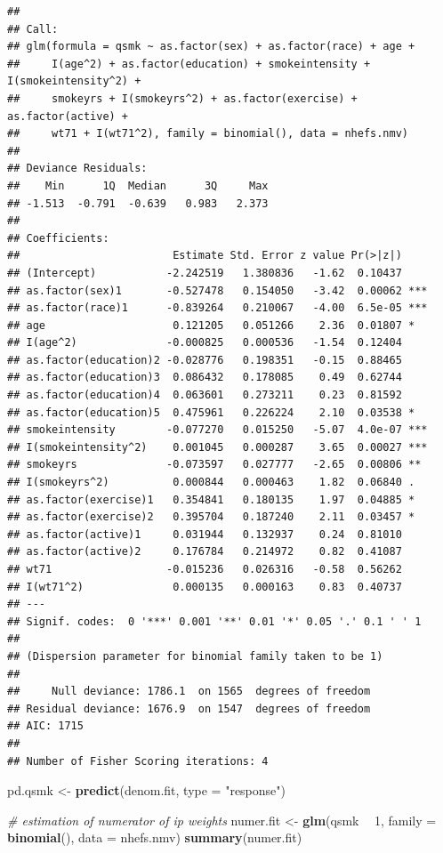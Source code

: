 \documentclass[
  10pt,
]{book}
\newenvironment{Shaded}{\begin{snugshade}}{\end{snugshade}}
\newcommand{\CommentTok}[1]{\textcolor[rgb]{0.56,0.35,0.01}{\textit{#1}}}
\newcommand{\DataTypeTok}[1]{\textcolor[rgb]{0.13,0.29,0.53}{#1}}
\newcommand{\DecValTok}[1]{\textcolor[rgb]{0.00,0.00,0.81}{#1}}
\newcommand{\KeywordTok}[1]{\textcolor[rgb]{0.13,0.29,0.53}{\textbf{#1}}}
\newcommand{\NormalTok}[1]{#1}
\newcommand{\OperatorTok}[1]{\textcolor[rgb]{0.81,0.36,0.00}{\textbf{#1}}}
\newcommand{\StringTok}[1]{\textcolor[rgb]{0.31,0.60,0.02}{#1}}
\begin{document}
\begin{verbatim}
## 
## Call:
## glm(formula = qsmk ~ as.factor(sex) + as.factor(race) + age + 
##     I(age^2) + as.factor(education) + smokeintensity + I(smokeintensity^2) + 
##     smokeyrs + I(smokeyrs^2) + as.factor(exercise) + as.factor(active) + 
##     wt71 + I(wt71^2), family = binomial(), data = nhefs.nmv)
## 
## Deviance Residuals: 
##    Min      1Q  Median      3Q     Max  
## -1.513  -0.791  -0.639   0.983   2.373  
## 
## Coefficients:
##                        Estimate Std. Error z value Pr(>|z|)    
## (Intercept)           -2.242519   1.380836   -1.62  0.10437    
## as.factor(sex)1       -0.527478   0.154050   -3.42  0.00062 ***
## as.factor(race)1      -0.839264   0.210067   -4.00  6.5e-05 ***
## age                    0.121205   0.051266    2.36  0.01807 *  
## I(age^2)              -0.000825   0.000536   -1.54  0.12404    
## as.factor(education)2 -0.028776   0.198351   -0.15  0.88465    
## as.factor(education)3  0.086432   0.178085    0.49  0.62744    
## as.factor(education)4  0.063601   0.273211    0.23  0.81592    
## as.factor(education)5  0.475961   0.226224    2.10  0.03538 *  
## smokeintensity        -0.077270   0.015250   -5.07  4.0e-07 ***
## I(smokeintensity^2)    0.001045   0.000287    3.65  0.00027 ***
## smokeyrs              -0.073597   0.027777   -2.65  0.00806 ** 
## I(smokeyrs^2)          0.000844   0.000463    1.82  0.06840 .  
## as.factor(exercise)1   0.354841   0.180135    1.97  0.04885 *  
## as.factor(exercise)2   0.395704   0.187240    2.11  0.03457 *  
## as.factor(active)1     0.031944   0.132937    0.24  0.81010    
## as.factor(active)2     0.176784   0.214972    0.82  0.41087    
## wt71                  -0.015236   0.026316   -0.58  0.56262    
## I(wt71^2)              0.000135   0.000163    0.83  0.40737    
## ---
## Signif. codes:  0 '***' 0.001 '**' 0.01 '*' 0.05 '.' 0.1 ' ' 1
## 
## (Dispersion parameter for binomial family taken to be 1)
## 
##     Null deviance: 1786.1  on 1565  degrees of freedom
## Residual deviance: 1676.9  on 1547  degrees of freedom
## AIC: 1715
## 
## Number of Fisher Scoring iterations: 4
\end{verbatim}

\begin{Shaded}
\begin{Highlighting}[]
\NormalTok{pd.qsmk <-}\StringTok{ }\KeywordTok{predict}\NormalTok{(denom.fit, }\DataTypeTok{type =} \StringTok{"response"}\NormalTok{)}

\CommentTok{# estimation of numerator of ip weights}
\NormalTok{numer.fit <-}\StringTok{ }\KeywordTok{glm}\NormalTok{(qsmk }\OperatorTok{~}\StringTok{ }\DecValTok{1}\NormalTok{, }\DataTypeTok{family =} \KeywordTok{binomial}\NormalTok{(), }\DataTypeTok{data =}\NormalTok{ nhefs.nmv)}
\KeywordTok{summary}\NormalTok{(numer.fit)}
\end{Highlighting}
\end{Shaded}
\end{document}
